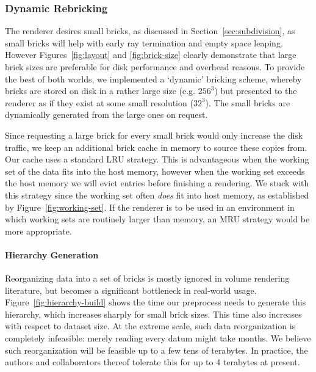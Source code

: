 \subsubsection{Dynamic Rebricking}
\label{sec:rebricking}


The renderer desires small bricks, as discussed in
Section~\ref{sec:subdivision}, as small bricks will help with early ray
termination and empty space leaping.  However Figures~\ref{fig:layout}
and \ref{fig:brick-size} clearly demonstrate that large brick sizes
are preferable for disk performance and overhead reasons.  To provide
the best of both worlds, we implemented a `dynamic' bricking scheme,
whereby bricks are stored on disk in a rather large size (e.g. $256^3$)
but presented to the renderer as if they exist at some small resolution
($32^3$).  The small bricks are dynamically generated from the large ones on
request.

Since requesting a large brick for every small brick would only
increase the disk traffic, we keep an additional brick cache in memory
to source these copies from.  Our cache uses a standard LRU strategy.
This is advantageous when the working set of the data fits into the
host memory, however when the working set exceeds the host memory we
will evict entries before finishing a rendering.  We stuck with this
strategy since the working set
often \emph{does} fit into host memory, as established by
Figure~\ref{fig:working-set}.  If the renderer is to be used in an
environment in which working sets are routinely larger than memory, an
MRU strategy would be more appropriate.

\paragraph{Hierarchy Generation}

Reorganizing data into a set of bricks is mostly ignored in volume
rendering literature, but becomes a significant bottleneck in
real-world usage.
Figure~\ref{fig:hierarchy-build} shows the time our preprocess needs
to generate this hierarchy, which increases sharply for small brick
sizes.  This time also increases with respect to dataset size.  At
the extreme scale, such data reorganization is completely infeasible:
merely reading every datum might take months.  We believe such
reorganization will be feasible up to a few tens of terabytes.  In
practice, the authors and collaborators thereof tolerate this for up to
4 terabytes at present.

